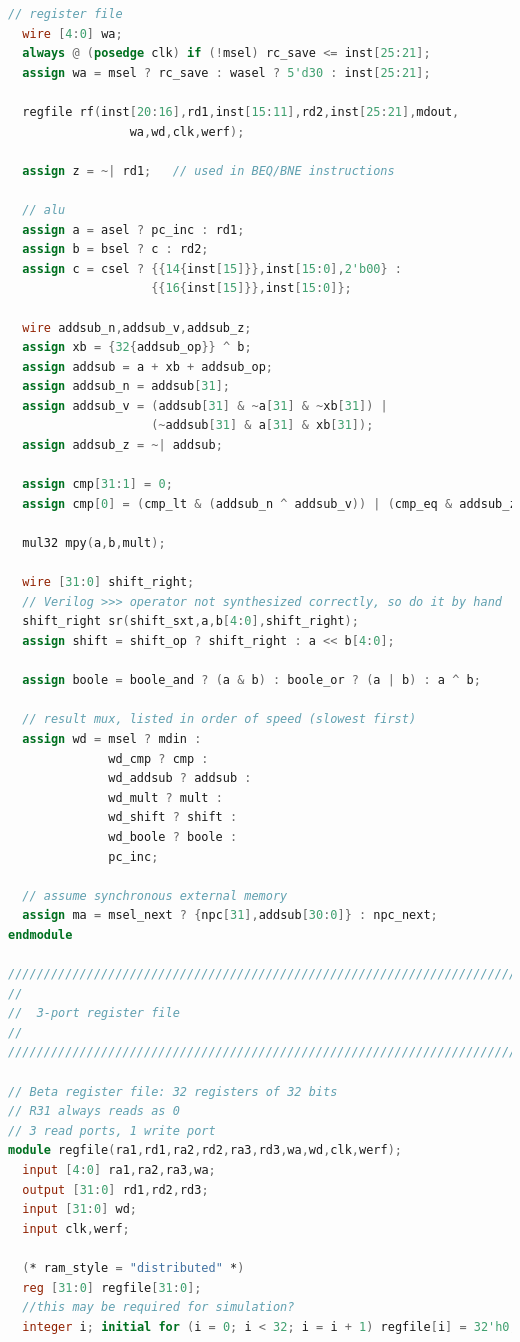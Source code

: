 \documentclass{article}
\begin{document}
\begin{lstlisting}[language=Verilog]
  // register file
  wire [4:0] wa;
  always @ (posedge clk) if (!msel) rc_save <= inst[25:21];
  assign wa = msel ? rc_save : wasel ? 5'd30 : inst[25:21];

  regfile rf(inst[20:16],rd1,inst[15:11],rd2,inst[25:21],mdout,
                 wa,wd,clk,werf);

  assign z = ~| rd1;   // used in BEQ/BNE instructions

  // alu
  assign a = asel ? pc_inc : rd1;
  assign b = bsel ? c : rd2;
  assign c = csel ? {{14{inst[15]}},inst[15:0],2'b00} :
                    {{16{inst[15]}},inst[15:0]};

  wire addsub_n,addsub_v,addsub_z;
  assign xb = {32{addsub_op}} ^ b;
  assign addsub = a + xb + addsub_op;
  assign addsub_n = addsub[31];
  assign addsub_v = (addsub[31] & ~a[31] & ~xb[31]) |
                    (~addsub[31] & a[31] & xb[31]);
  assign addsub_z = ~| addsub;

  assign cmp[31:1] = 0;
  assign cmp[0] = (cmp_lt & (addsub_n ^ addsub_v)) | (cmp_eq & addsub_z);

  mul32 mpy(a,b,mult);

  wire [31:0] shift_right;
  // Verilog >>> operator not synthesized correctly, so do it by hand
  shift_right sr(shift_sxt,a,b[4:0],shift_right);
  assign shift = shift_op ? shift_right : a << b[4:0];

  assign boole = boole_and ? (a & b) : boole_or ? (a | b) : a ^ b;

  // result mux, listed in order of speed (slowest first)
  assign wd = msel ? mdin :
              wd_cmp ? cmp :
              wd_addsub ? addsub :
              wd_mult ? mult :
              wd_shift ? shift :
              wd_boole ? boole :
              pc_inc;

  // assume synchronous external memory
  assign ma = msel_next ? {npc[31],addsub[30:0]} : npc_next;
endmodule

///////////////////////////////////////////////////////////////////////////////
//
//	3-port register file
//
///////////////////////////////////////////////////////////////////////////////

// Beta register file: 32 registers of 32 bits
// R31 always reads as 0
// 3 read ports, 1 write port
module regfile(ra1,rd1,ra2,rd2,ra3,rd3,wa,wd,clk,werf);
  input [4:0] ra1,ra2,ra3,wa;
  output [31:0] rd1,rd2,rd3;
  input [31:0] wd;
  input clk,werf;

  (* ram_style = "distributed" *)
  reg [31:0] regfile[31:0];
  //this may be required for simulation?
  integer i; initial for (i = 0; i < 32; i = i + 1) regfile[i] = 32'h0;


\end{lstlisting}
\end{document}
